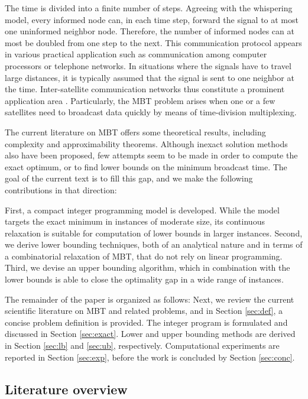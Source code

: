The time is divided into a finite number of steps.
Agreeing with the whispering model, every informed node can, in each time step, forward the signal to at most one uninformed neighbor node.
Therefore, the number of informed nodes can at most be doubled from one step to the next.
This communication protocol appears in various practical application such as communication among computer processors or telephone networks.
In situations where the signals have to travel large distances, it is typically assumed that the signal is sent to one neighbor at the time.
Inter-satellite communication networks thus constitute a prominent application area \cite{chu17}.
Particularly, the MBT problem arises when one or a few satellites need to broadcast data quickly by means of time-division multiplexing.

The current literature on MBT offers some theoretical results, including complexity and approximability theorems.
Although inexact solution methods also have been proposed, few attempts seem to be made in order to compute the exact optimum,
or to find lower bounds on the minimum broadcast time.
The goal of the current text is to fill this gap, and we make the following contributions in that direction:

First, a compact integer programming model is developed.
While the model targets the exact minimum in instances of moderate size, its continuous relaxation is suitable for computation of lower bounds in larger instances.
Second, we derive lower bounding techniques, both of an analytical nature and in terms of a combinatorial relaxation of MBT,
that do not rely on linear programming.
Third, we devise an upper bounding algorithm, which in combination with the lower bounds is able to close the optimality gap in a wide range of instances.

The remainder of the paper is organized as follows:
Next, we review the current scientific literature on MBT and related problems,
and in Section \ref{sec:def}, a concise problem definition is provided.
The integer program is formulated and discussed in Section \ref{sec:exact}.
Lower and upper bounding methods are derived in Section \ref{sec:lb} and \ref{sec:ub}, respectively.
Computational experiments are reported in Section \ref{sec:exp}, before the work is concluded by Section \ref{sec:conc}.

\subsection{Literature overview} \label{sec:litrev}

